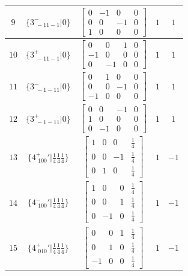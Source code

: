\documentclass[fleqn,8pt]{jsarticle}
\begin{document}
\begin{longtable}{ccccc}
$ 9 $ & $ \{3^{-}_{\,\,-11-1}|0\} $ & $ \begin{bmatrix} 0 & -1 & 0 & 0 \\ 0 & 0 & -1 & 0 \\ 1 & 0 & 0 & 0 \end{bmatrix} $ & $ 1 $ & $ 1 $ \\ \hline
$ 10 $ & $ \{3^{+}_{\,\,-11-1}|0\} $ & $ \begin{bmatrix} 0 & 0 & 1 & 0 \\ -1 & 0 & 0 & 0 \\ 0 & -1 & 0 & 0 \end{bmatrix} $ & $ 1 $ & $ 1 $ \\ \hline
$ 11 $ & $ \{3^{-}_{\,\,-1-11}|0\} $ & $ \begin{bmatrix} 0 & 1 & 0 & 0 \\ 0 & 0 & -1 & 0 \\ -1 & 0 & 0 & 0 \end{bmatrix} $ & $ 1 $ & $ 1 $ \\ \hline
$ 12 $ & $ \{3^{+}_{\,\,-1-11}|0\} $ & $ \begin{bmatrix} 0 & 0 & -1 & 0 \\ 1 & 0 & 0 & 0 \\ 0 & -1 & 0 & 0 \end{bmatrix} $ & $ 1 $ & $ 1 $ \\ \hline
$ 13 $ & $ \{4^{+}_{\,\,100}{}'|\frac{1}{4} \frac{1}{4} \frac{1}{4}\} $ & $ \begin{bmatrix} 1 & 0 & 0 & \frac{1}{4} \\ 0 & 0 & -1 & \frac{1}{4} \\ 0 & 1 & 0 & \frac{1}{4} \end{bmatrix} $ & $ 1 $ & $ -1 $ \\ \hline
$ 14 $ & $ \{4^{-}_{\,\,100}{}'|\frac{1}{4} \frac{1}{4} \frac{1}{4}\} $ & $ \begin{bmatrix} 1 & 0 & 0 & \frac{1}{4} \\ 0 & 0 & 1 & \frac{1}{4} \\ 0 & -1 & 0 & \frac{1}{4} \end{bmatrix} $ & $ 1 $ & $ -1 $ \\ \hline
$ 15 $ & $ \{4^{+}_{\,\,010}{}'|\frac{1}{4} \frac{1}{4} \frac{1}{4}\} $ & $ \begin{bmatrix} 0 & 0 & 1 & \frac{1}{4} \\ 0 & 1 & 0 & \frac{1}{4} \\ -1 & 0 & 0 & \frac{1}{4} \end{bmatrix} $ & $ 1 $ & $ -1 $ \\ \hline

\end{longtable}
\end{document}
